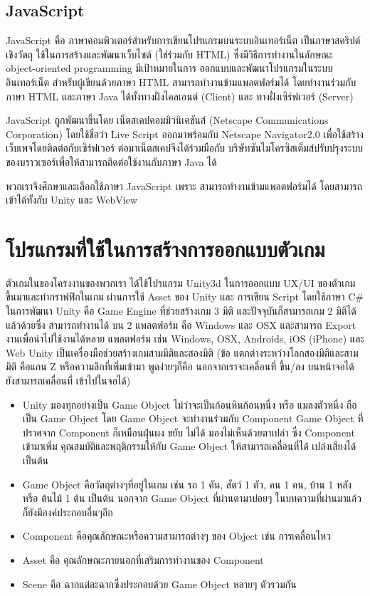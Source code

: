 \subsection{JavaScript}
JavaScript คือ ภาษาคอมพิวเตอร์สำหรับการเขียนโปรแกรมบนระบบอินเทอร์เน็ต 
เป็นภาษาสคริปต์เชิงวัตถุ ใช้ในการสร้างและพัฒนาเว็บไซต์ (ใช่ร่วมกับ HTML) 
ซึ่งมีวิธีการทำงานในลักษณะ object-oriented programming มีเป้าหมายในการ 
ออกแบบและพัฒนาโปรแกรมในระบบอินเทอร์เน็ต สำหรับผู้เขียนด้วยภาษา HTML 
สามารถทำงานข้ามแพลตฟอร์มได้ โดยทำงานร่วมกับ ภาษา HTML และภาษา Java 
ได้ทั้งทางฝั่งไคลเอนต์ (Client) และ ทางฝั่งเซิร์ฟเวอร์ (Server)\par
JavaScript ถูกพัฒนาขึ้นโดย เน็ตสเคปคอมมิวนิเคชันส์ 
(Netscape Communications Corporation) 
โดยใช้ชื่อว่า Live Script ออกมาพร้อมกับ Netscape Navigator2.0 
เพื่อใช้สร้างเว็บเพจโดยติดต่อกับเซิร์ฟเวอร์
ต่อมาเน็ตสเคปจึงได้ร่วมมือกับ บริษัทซันไมโครซิสเต็มส์ปรับปรุงระบบ
ของบราวเซอร์เพื่อให้สามารถติดต่อใช้งานกับภาษา Java ได้~\cite{js}\par
พวกเราจึงศึกษาและเลือกใช้ภาษา JavaScript เพราะ 
สามารถทำงานข้ามแพลตฟอร์มได้ โดยสามารถเข้าได้ทั้งกับ Unity และ WebView

\section{โปรแกรมที่ใช้ในการสร้างการออกแบบตัวเกม}
ตัวเกมในของโครงงานของพวกเรา ได้ใช้โปรแกรม Unity3d
ในการออกแบบ UX/UI ของตัวเกมขึ้นมาและทำกราฟฟิกในเกม 
ผ่านการใช้ Asset ของ Unity และ การเขียน Script 
โดยใช้ภาษา C\# ในการพัฒนา\newline
Unity คือ Game Engine ที่ช่วยสร้างเกม 3 มิติ 
และปัจจุบันก็สามารถเกม 2 มิติได้แล้วด้วยซึ่ง 
สามารถทำงานได้ บน 2 แพลตฟอร์ม คือ Windows และ OSX 
และสามารถ Export งานเพื่อนำไปใช้งานได้หลาย แพลตฟอร์ม 
เช่น Windows, OSX, Androids, iOS (iPhone) และ Web\newline
Unity เป็นเครื่องมือช่วยสร้างเกมสามมิติและสองมิติ 
(ข้อ แตกต่างระหว่างโลกสองมิติและสามมิติ คือแกน Z หรือความลึกที่เพิ่มเข้ามา 
พูดง่ายๆก็คือ นอกจากเราจะเคลื่อนที่ ขึ้น/ลง บนหน้าจอได้ ยังสามารถเคลื่อนที่ 
เข้าไปในจอได้)~\cite{unth}
\begin{itemize}
  \item Unity มองทุกอย่างเป็น Game Object ไม่ว่าจะเป็นก้อนหินก้อนหนึ่ง 
  หรือ แมลงตัวหนึ่ง ถือเป็น Game Object โดย Game Object 
  จะทำงานร่วมกับ Component Game Object ที่ปราศจาก Component 
  ก็เหมือนฝุ่นผง ขยับ ไม่ได้ มองไม่เห็นด้วยตาเปล่า ซึ่ง Component 
  เข้ามาเพิ่ม คุณสมบัติและพฤติกรรมให้กับ Game Object ให้สามารถเคลื่อนที่ได้ 
  เปล่งเสียงได้ เป็นต้น
  \item Game Object คือวัตถุต่างๆที่อยู่ในเกม 
  เช่น รถ 1 คัน, สัตว์ 1 ตัว, คน 1 คน, บ้าน 1 หลัง หรือ ต้นไม้ 1 ต้น เป็นต้น 
  นอกจาก Game Object ที่ผ่านตามาบ่อยๆ ในบทความที่ผ่านมาแล้ว 
  ก็ยังมีองค์ประกอบอื่นๆอีก
  \item Component คือคุณลักษณะหรือความสามารถต่างๆ ของ Object เช่น การเคลื่อนไหว
  \item Asset คือ คุณลักษณะภายนอกที่เสริมการทำงานของ Component
  \item Scene คือ ฉากแต่ละฉากซึ่งประกอบด้วย Game Object หลายๆ ตัวรวมกัน
\end{itemize}

